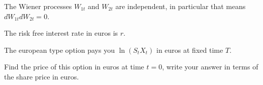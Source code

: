 \documentclass[12pt]{article}
\begin{document}
\begin{enumerate}
The Wiener processes $W_{1t}$ and $W_{2t}$ are independent, in particular that means $dW_{1t}dW_{2t} = 0$.

The risk free interest rate in euros is $r$.

The european type option pays you $\ln (S_t X_t)$ in euros at fixed time $T$. 

Find the price of this option in euros at time $t=0$, 
write your answer in terms of the share price in euros. 

\end{enumerate}
\end{document}
